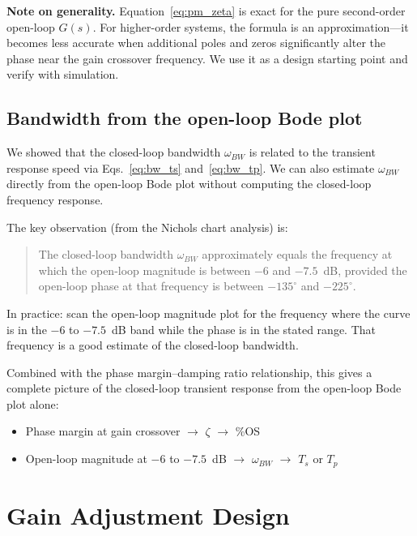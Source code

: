 \documentclass[12pt]{article}
\begin{document}
\medskip
\noindent\textbf{Note on generality.}  Equation~\eqref{eq:pm_zeta} is exact for the
pure second-order open-loop $G(s)$.  For higher-order systems, the formula is
an approximation---it becomes less accurate when additional poles and zeros
significantly alter the phase near the gain crossover frequency.  We use it as
a design starting point and verify with simulation.

\subsection{Bandwidth from the open-loop Bode plot}
\label{sec:bw_ol}

We showed that the closed-loop bandwidth $\omega_{BW}$ is related to the
transient response speed via Eqs.~\eqref{eq:bw_ts} and~\eqref{eq:bw_tp}.  We
can also estimate $\omega_{BW}$ directly from the open-loop Bode plot without
computing the closed-loop frequency response.

The key observation (from the Nichols chart analysis) is:

\begin{quote}
The closed-loop bandwidth $\omega_{BW}$ approximately equals the frequency
at which the open-loop magnitude is between $-6$ and $-7.5$~dB, provided the
open-loop phase at that frequency is between $-135^\circ$ and $-225^\circ$.
\end{quote}

In practice: scan the open-loop magnitude plot for the frequency where the
curve is in the $-6$ to $-7.5$~dB band while the phase is in the stated
range.  That frequency is a good estimate of the closed-loop bandwidth.

Combined with the phase margin--damping ratio relationship, this gives a
complete picture of the closed-loop transient response from the open-loop
Bode plot alone:
\begin{itemize}
  \item Phase margin at gain crossover $\rightarrow$ $\zeta$ $\rightarrow$ \%OS
  \item Open-loop magnitude at $-6$ to $-7.5$~dB $\rightarrow$ $\omega_{BW}$ $\rightarrow$ $T_s$ or $T_p$
\end{itemize}

\section{Gain Adjustment Design}
\label{sec:gain_design}
\end{document}
